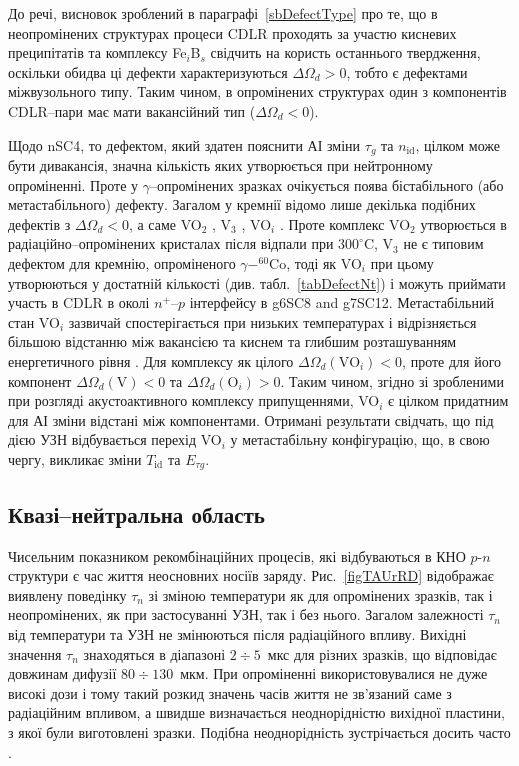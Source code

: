 До речі, висновок зроблений в параграфі~\ref{sbDefectType} про те, що
в неопромінених структурах процеси CDLR проходять за участю кисневих преципітатів та комплексу Fe$_i$B$_s$ свідчить на користь
останнього твердження, оскільки обидва ці дефекти характеризуються $\Delta\Omega_d>0$, тобто є дефектами міжвузольного типу.
Таким чином, в опромінених структурах один з компонентів CDLR--пари
має мати вакансійний тип ($\Delta\Omega_d<0$).

Щодо nSC4, то дефектом, який здатен пояснити АІ зміни $\tau_g$ та $n_\mathrm{id}$, цілком може бути дивакансія,
значна кількість яких утворюється при нейтронному опроміненні.
Проте у $\gamma$--опромінених зразках очікується поява бістабільного (або метастабільного) дефекту.
Загалом у кремнії відомо лише декілька подібних дефектів з $\Delta\Omega_d<0$, а саме
 VO$_2$ \cite{FTP:Murin},
 V$_3$ \cite{V3:Markevich},
 VO$_i$ \cite{MetaUFN}.
Проте комплекс VO$_2$ утворюється в радіаційно--опромінених кристалах після відпали при $300^\circ$C,
V$_3$ не є типовим дефектом для кремнію, опроміненого $\gamma-^{60}$Co,
тоді як VO$_i$ при цьому утворюються у достатній кількості (див. табл.~\ref{tabDefectNt}) і можуть приймати
участь в CDLR в околі $n^+$--$p$ інтерфейсу в g6SC8 and g7SC12.
Метастабільний стан VO$_i$ зазвичай спостерігається при низьких температурах
і відрізняється більшою відстанню між вакансією та киснем та глибшим розташуванням енергетичного рівня \cite{MetaUFN}.
Для комплексу як цілого $\Delta\Omega_d(\mbox{VO}_i)<0$,
проте для його компонент $\Delta\Omega_d(\mbox{V})<0$ та $\Delta\Omega_d(\mbox{O}_i)>0$.
Таким чином, згідно зі зробленими при розгляді акустоактивного комплексу припущеннями,
VO$_i$ є цілком придатним для АІ зміни відстані між компонентами.
Отримані результати свідчать, що під дією УЗН  відбувається
перехід VO$_i$ у метастабільну конфігурацію, що, в свою чергу,
викликає зміни $T_{\mathrm{id}}$ та $E_{\tau g}$.





\subsection{Квазі--нейтральна область\label{sbRadDef}}

Чисельним показником рекомбінаційних процесів, які відбуваються в КНО $p$-$n$ структури є
час життя неосновних носіїв заряду.
Рис.~\ref{figTAUrRD} відображає виявлену поведінку $\tau_n$ зі зміною температури як для опромінених зразків,
так і неопромінених, як при застосуванні УЗН, так і без нього.
Загалом залежності $\tau_n$ від температури та УЗН не змінюються після радіаційного впливу.
Вихідні значення $\tau_n$ знаходяться в діапазоні $2\div5$~мкс для різних зразків,
що відповідає довжинам дифузії $80\div130$~мкм.
При опроміненні використовувалися не дуже високі дози і тому
такий розкид значень часів життя не зв'язаний саме з радіаційним впливом,
а швидше визначається неоднорідністю вихідної пластини, з якої були виготовлені зразки.
Подібна неоднорідність зустрічається досить часто \cite{Oxide:Chen,Oxide_Schon}.


